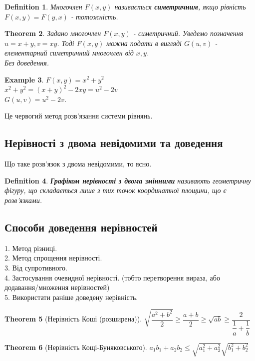 \documentclass[a4paper, 10pt]{article}
\theoremstyle{theoremdd}
\newtheorem{theorem}{Theorem}[subsection]
\theoremstyle{theoremdd}
\newtheorem{definition}[theorem]{Definition}
\theoremstyle{theoremdd}
\theoremstyle{theoremdd}
\newtheorem{example}[theorem]{Example}
\theoremstyle{theoremdd}
\theoremstyle{theoremdd}
\theoremstyle{theoremdd}
\theoremstyle{theoremdd}
\begin{document}
\begin{definition}
Многочлен $F(x,y)$ називається \textbf{симетричним}, якщо рівність $F(x,y) = F(y,x)$ - тотожність.
\end{definition}

\begin{theorem}
Задано многочлен $F(x,y)$ - симетричний. Уведемо позначення $u=x+y, v=xy$. Тоді $F(x,y)$ можна подати в вигляді $G(u,v)$ - елементарний симетричний многочлен від $x,y$.\\
\textit{Без доведення.}
\end{theorem}

\begin{example}
$F(x,y) = x^2+y^2$\\
$x^2+y^2 = (x+y)^2 - 2xy = u^2 - 2v$\\
$G(u,v) = u^2-2v$.
\end{example}
Це червогий метод розв'язання системи рівнянь.
\newpage

\subsection{Нерівності з двома невідомими та доведення}
Що таке розв'язок з двома невідомими, то ясно.

\begin{definition}
\textbf{Графіком нерівності з двома змінними} називають геометричну фігуру, що складається лише з тих точок координатної площини, що є розв'язками.
\end{definition}

\subsection{Способи доведення нерівностей}
1. Метод різниці.\\
2. Метод спрощення нерівності.\\
3. Від супротивного.\\
4. Застосування очевидної нерівності. (тобто перетворення вираза, або додавання/множення нерівностей)\\
5. Використати раніше доведену нерівність.

\begin{theorem}[Нерівність Коші (розширена)]
$\sqrt{\dfrac{a^2+b^2}{2}} \geq \dfrac{a+b}{2} \geq \sqrt{ab} \geq \dfrac{2}{\dfrac{1}{a} + \dfrac{1}{b}}$
\end{theorem}

\begin{theorem}[Нерівність Кощі-Буняковського]
$a_1b_1 + a_2b_2 \leq \sqrt{a_1^2+a_2^2} \sqrt{b_1^2+b_2^2}$
\end{theorem}
\end{document}
